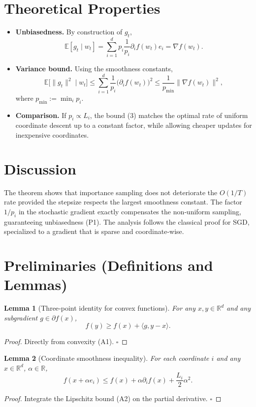 \documentclass{article}
\newcommand{\E}{\mathbb{E}}
\newcommand{\R}{\mathbb{R}}
\newcommand{\ip}[2]{\langle #1,#2\rangle}
\newtheorem{lemma}{Lemma}
\begin{document}
\section*{Theoretical Properties}
\begin{itemize}
\item \textbf{Unbiasedness.} By construction of $g_t$,
\[
\E[g_t\mid w_t]=\sum_{i=1}^dp_i\frac{1}{p_i}\partial_i f(w_t)e_i=\nabla f(w_t).
\tag{P1}
\]
\item \textbf{Variance bound.} Using the smoothness constants,
\[
\E\!\big[\|g_t\|^2\mid w_t\big]\le \sum_{i=1}^d\frac{1}{p_i}\big(\partial_i f(w_t)\big)^2
\le \frac{1}{p_{\min}}\|\nabla f(w_t)\|^2,
\tag{P2}
\]
where $p_{\min}:=\min_i p_i$.
\item \textbf{Comparison.} If $p_i\propto L_i$, the bound (3) matches the optimal rate of uniform coordinate descent up to a constant factor, while allowing cheaper updates for inexpensive coordinates.
\end{itemize}

\section*{Discussion}
The theorem shows that importance sampling does not deteriorate the $O(1/T)$ rate provided the stepsize respects the largest smoothness constant. The factor $1/p_i$ in the stochastic gradient exactly compensates the non‑uniform sampling, guaranteeing unbiasedness (P1). The analysis follows the classical proof for SGD, specialized to a gradient that is sparse and coordinate‑wise.

\newpage
\section*{Preliminaries (Definitions and Lemmas)}
\begin{lemma}[Three‑point identity for convex functions]\label{lem:three}
For any $x,y\in\R^{d}$ and any subgradient $g\in\partial f(x)$,
\[
f(y)\ge f(x)+\ip{g}{y-x}.
\tag{L1}
\]
\end{lemma}
\begin{proof}
Directly from convexity (A1). \hfill $\square$
\end{proof}

\begin{lemma}[Coordinate smoothness inequality]\label{lem:smooth}
For each coordinate $i$ and any $x\in\R^{d}$, $\alpha\in\R$,
\[
f(x+\alpha e_i)\le f(x)+\alpha\partial_i f(x)+\frac{L_i}{2}\alpha^2.
\tag{L2}
\]
\end{lemma}
\begin{proof}
Integrate the Lipschitz bound (A2) on the partial derivative. \hfill $\square$
\end{proof}
\end{document}
